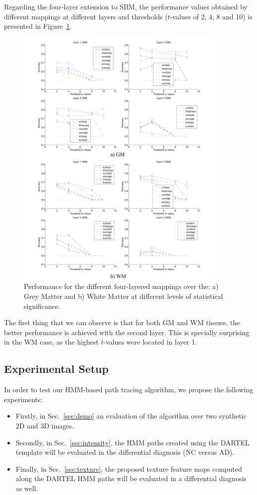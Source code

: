 Regarding the four-layer extension to \ac{SBM}, the performance values obtained by different mappings at different layers and thresholds ($t$-values of 2, 4, 8 and 10) is presented in Figure~\ref{fig:layeredPerf}. 

\begin{figure}[htp]
	\centering
	\includegraphics[width=0.9\textwidth]{gfx/ch6/11-layerPerf}
	\caption{Performance for the different four-layered mappings over the: a) Grey Matter and b) White Matter at different levels of statistical significance.}
	\label{fig:layeredPerf}
\end{figure}

The first thing that we can observe is that for both \ac{GM} and \ac{WM} tissues, the better performance is achieved with the second layer. This is specially surprising in the \ac{WM} case, as the highest $t$-values were located in layer 1. 

\subsection{Experimental Setup}
In order to test our \ac{HMM}-based path tracing algorithm, we propose the following experiments: 
\begin{itemize}
	\item Firstly, in Sec.~\ref{sec:demo} an evaluation of the algorithm over two synthetic 2D and 3D images. 
	\item Secondly, in Sec.~\ref{sec:intensity}, the \ac{HMM} paths created using the DARTEL template will be evaluated in the differential diagnosis (NC versus AD). 
	\item Finally, in Sec.~\ref{sec:texture}, the proposed texture feature maps computed along the DARTEL \ac{HMM} paths will be evaluated in a differential diagnosis as well. 
\end{itemize}

